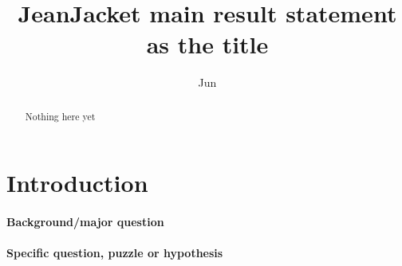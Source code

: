 \documentclass[onecolumn,11pt]{article}
\title{JeanJacket main result statement as the title}
\author[a]{Jun}
\affil[a]{University of California Irvine}
\date{} %
\begin{document}
\maketitle

\begin{abstract}
Nothing here yet
\end{abstract}












\section*{Introduction}

\paragraph{Background/major question} \lipsum[2]
\paragraph{Specific question, puzzle or hypothesis}\lipsum[2]
\end{document}
